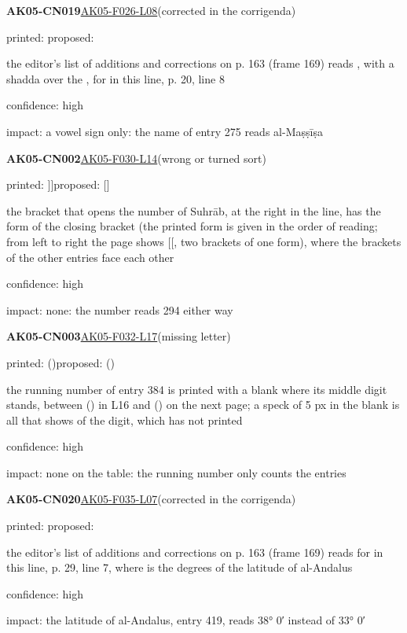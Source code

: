 \documentclass[11pt]{article}
\begin{document}
\noindent\textbf{AK05-CN019}\enspace\hyperlink{AK05-F026-L08}{AK05-F026-L08}\enspace(corrected in the corrigenda)\par\noindent printed: \enspace proposed: \par\noindent the editor's list of additions and corrections on p. 163 (frame 169) reads , with a shadda over the , for  in this line, p. 20, line 8\par\noindent confidence: high\par\noindent impact: a vowel sign only: the name of entry 275 reads al-Maṣṣīṣa\par\medskip
\noindent\textbf{AK05-CN002}\enspace\hyperlink{AK05-F030-L14}{AK05-F030-L14}\enspace(wrong or turned sort)\par\noindent printed: ]]\enspace proposed: []\par\noindent the bracket that opens the number of Suhrāb, at the right in the line, has the form of the closing bracket (the printed form is given in the order of reading; from left to right the page shows [[, two brackets of one form), where the brackets of the other entries face each other\par\noindent confidence: high\par\noindent impact: none: the number reads 294 either way\par\medskip
\noindent\textbf{AK05-CN003}\enspace\hyperlink{AK05-F032-L17}{AK05-F032-L17}\enspace(missing letter)\par\noindent printed: ()\enspace proposed: ()\par\noindent the running number of entry 384 is printed with a blank where its middle digit stands, between () in L16 and () on the next page; a speck of 5 px in the blank is all that shows of the digit, which has not printed\par\noindent confidence: high\par\noindent impact: none on the table: the running number only counts the entries\par\medskip
\noindent\textbf{AK05-CN020}\enspace\hyperlink{AK05-F035-L07}{AK05-F035-L07}\enspace(corrected in the corrigenda)\par\noindent printed: \enspace proposed: \par\noindent the editor's list of additions and corrections on p. 163 (frame 169) reads  for  in this line, p. 29, line 7, where  is the degrees of the latitude of al-Andalus\par\noindent confidence: high\par\noindent impact: the latitude of al-Andalus, entry 419, reads 38° 0′ instead of 33° 0′\par\medskip
\end{document}
